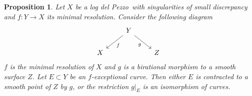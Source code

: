 \documentclass[12pt,a4paper]{book}      %
\newtheorem{prop}[thm]{Proposition}
\theoremstyle{definition}
\newcommand{\ldp}{log del Pezzo}
\newcommand{\ra}{\rightarrow}
\begin{document}
\begin{prop}\label{MainProp}
Let $X$ be a \ldp\ with singularities of small discrepancy and $f \colon Y \ra X$ its minimal resolution.
Consider the following diagram
\[
\begin{tikzcd}
  & Y \arrow[rd, "\scriptstyle{g}"'] \arrow[ld, "\scriptstyle{f}"] &   \\
X &                                                                & Z
\end{tikzcd}
\]
$f$ is the minimal resolution of $X$ and $g$ is a birational morphism to a smooth surface $Z$.
Let $E\subset Y$ be an $f$-exceptional curve. Then either $E$ is contracted to a smooth point
of $Z$ by $g$, or the restriction $g|_E$ is an isomorphism of curves.
\end{prop}
\end{document}
